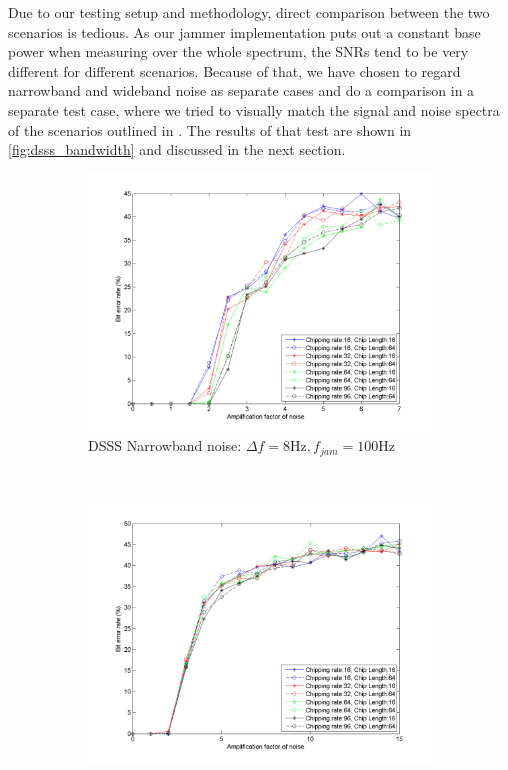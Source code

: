 			Due to our testing setup and methodology, direct comparison between the two scenarios is tedious. As our jammer implementation puts out a constant base power when measuring over the whole spectrum, the SNRs tend to be very different for different scenarios. Because of that, we have chosen to regard narrowband and wideband noise as separate cases and do a comparison in a separate test case, where we tried to visually match the signal and noise spectra of the scenarios outlined in \cite{ISS}. The results of that test are shown in \ref{fig:dsss_bandwidth} and discussed in the next section.
				\begin{figure}[H]
					\centering
					\caption{}
				    \begin{subfigure}[b]{0.5\textwidth}
						\includegraphics[width=\textwidth]{imgs/results/plot_mode_dsss-test_narrowband-rep_20-dataRate_8-dataLength_128.png}
						\caption{DSSS Narrowband noise: $\Delta f= 8 \text{Hz}, f_{jam} = 100\text{Hz}$}
						\label{fig:dsss_narrowband}
					\end{subfigure}%
					~
					\begin{subfigure}[b]{0.5\textwidth}
						\includegraphics[width=\textwidth]{imgs/results/plot_mode_dsss-test_wideband-rep_20-dataRate_8-dataLength_128.png}

\end{subfigure}
\end{figure}
